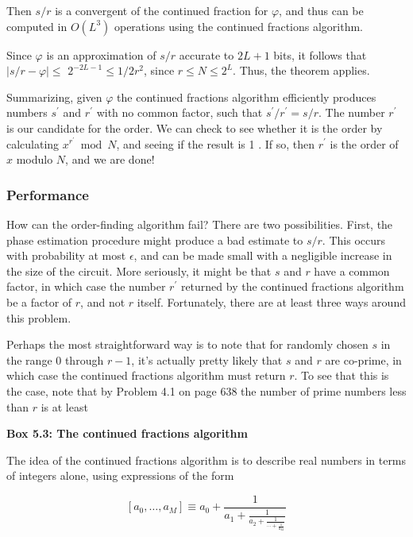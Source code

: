 Then $s / r$ is a convergent of the continued fraction for $\varphi$, and thus can be computed in $O\left(L^{3}\right)$ operations using the continued fractions algorithm.

Since $\varphi$ is an approximation of $s / r$ accurate to $2 L+1$ bits, it follows that $|s / r-\varphi| \leq$ $2^{-2 L-1} \leq 1 / 2 r^{2}$, since $r \leq N \leq 2^{L}$. Thus, the theorem applies.

Summarizing, given $\varphi$ the continued fractions algorithm efficiently produces numbers $s^{\prime}$ and $r^{\prime}$ with no common factor, such that $s^{\prime} / r^{\prime}=s / r$. The number $r^{\prime}$ is our candidate for the order. We can check to see whether it is the order by calculating $x^{r^{\prime}} \bmod N$, and seeing if the result is 1 . If so, then $r^{\prime}$ is the order of $x$ modulo $N$, and we are done!

\subsubsection*{Performance}
How can the order-finding algorithm fail? There are two possibilities. First, the phase estimation procedure might produce a bad estimate to $s / r$. This occurs with probability at most $\epsilon$, and can be made small with a negligible increase in the size of the circuit. More seriously, it might be that $s$ and $r$ have a common factor, in which case the number $r^{\prime}$ returned by the continued fractions algorithm be a factor of $r$, and not $r$ itself. Fortunately, there are at least three ways around this problem.

Perhaps the most straightforward way is to note that for randomly chosen $s$ in the range 0 through $r-1$, it's actually pretty likely that $s$ and $r$ are co-prime, in which case the continued fractions algorithm must return $r$. To see that this is the case, note that by Problem 4.1 on page 638 the number of prime numbers less than $r$ is at least

\textbf{Box 5.3: The continued fractions algorithm}

The idea of the continued fractions algorithm is to describe real numbers in terms of integers alone, using expressions of the form

\begin{equation*}
\left[a_{0}, \ldots, a_{M}\right] \equiv a_{0}+\frac{1}{a_{1}+\frac{1}{a_{2}+\frac{1}{\cdots+\frac{1}{a_{M}}}}} \tag{5.49}
\end{equation*}


